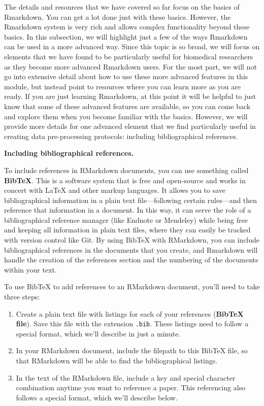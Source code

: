 \documentclass[]{tufte-book}
\providecommand{\tightlist}{%
  \setlength{\itemsep}{0pt}\setlength{\parskip}{0pt}}
\begin{document}
The details and resources that we have covered so far focus on the basics of
Rmarkdown. You can get a lot done just with these basics. However, the Rmarkdown
system is very rich and allows complex functionality beyond these basics. In
this subsection, we will highlight just a few of the ways Rmarkdown can be used
in a more advanced way. Since this topic is so broad, we will focus on elements
that we have found to be particularly useful for biomedical researchers as they
become more advanced Rmarkdown users. For the most part, we will not go into
extensive detail about how to use these more advanced features in this module,
but instead point to resources where you can learn more as you are ready. If you
are just learning Rmarkdown, at this point it will be helpful to just know that
some of these advanced features are available, so you can come back and explore
them when you become familiar with the basics. However, we will provide more
details for one advanced element that we find particularly useful in creating data
pre-processing protocols: including bibliographical references.

\textbf{Including bibliographical references.}

To include references in RMarkdown documents, you can use something called
\textbf{BibTeX}. This is a software system that is free and open-source and works in
concert with LaTeX and other markup languages. It allows you to save bibliographical information in a plain
text file---following certain rules---and then reference that information in a
document. In this way, it can serve the role of a bibliographical reference
manager (like Endnote or Mendeley) while being free and keeping all information
in plain text files, where they can easily be tracked with version control like
Git. By using BibTeX with RMarkdown, you can include bibliographical references
in the documents that you create, and Rmarkdown will handle the creation of the
references section and the numbering of the documents within your text.

To use BibTeX to add references to an RMarkdown document, you'll need to take
three steps:

\begin{enumerate}
\def\labelenumi{\arabic{enumi}.}
\tightlist
\item
  Create a plain text file with listings for each of
  your references (\textbf{BibTeX file}). Save this file with the
  extension \texttt{.bib}. These listings need to follow a special format, which
  we'll describe in just a minute.
\item
  In your RMarkdown document, include the filepath
  to this BibTeX file, so that RMarkdown will be able to find the bibliographical
  listings.
\item
  In the text of the RMarkdown file, include a key and special character
  combination anytime you want to reference a paper. This referencing also
  follows a special format, which we'll describe below.
\end{enumerate}
\end{document}
